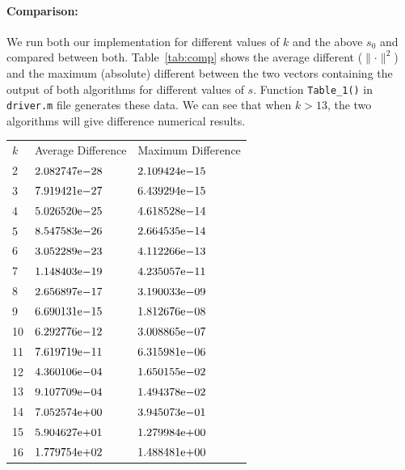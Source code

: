 \paragraph{Comparison:} We run both our implementation for different values of $k$ and the above $s_{0}$ and compared between both. Table~\ref{tab:comp} shows the average different ($\parallel \cdot \parallel^{2}$) and the maximum (absolute) different between the two vectors containing the output of both algorithms for different values of $s$. Function \texttt{Table\_1()} in \texttt{driver.m} file generates these data. We can see that when $k>13$, the two algorithms will give difference numerical results. 

\begin{table}[!tbh]
 \centering    
\begin{tabular}{ |p{1.5cm}| p{4cm}|| p{4cm}|}
\hline
 $k$  & Average Difference & Maximum Difference \\ \hhline{|=|=|=|}   
    2   & ${2.082747}\mathrm{e}{-28}$   & ${2.109424}\mathrm{e}{-15}$   \\
	3   & ${7.919421}\mathrm{e}{-27}$   & ${6.439294}\mathrm{e}{-15}$   \\
	4   & ${5.026520}\mathrm{e}{-25}$   & ${4.618528}\mathrm{e}{-14}$   \\
	5   & ${8.547583}\mathrm{e}{-26}$   & ${2.664535}\mathrm{e}{-14}$   \\
	6   & ${3.052289}\mathrm{e}{-23}$   & ${4.112266}\mathrm{e}{-13}$   \\
	7   & ${1.148403}\mathrm{e}{-19}$   & ${4.235057}\mathrm{e}{-11}$   \\
	8   & ${2.656897}\mathrm{e}{-17}$   & ${3.190033}\mathrm{e}{-09}$   \\
	9   & ${6.690131}\mathrm{e}{-15}$   & ${1.812676}\mathrm{e}{-08}$   \\
	10  & ${6.292776}\mathrm{e}{-12}$   & ${3.008865}\mathrm{e}{-07}$   \\
	11  & ${7.619719}\mathrm{e}{-11}$   & ${6.315981}\mathrm{e}{-06}$   \\
	12  & ${4.360106}\mathrm{e}{-04}$   & ${1.650155}\mathrm{e}{-02}$   \\
	13  & ${9.107709}\mathrm{e}{-04}$   & ${1.494378}\mathrm{e}{-02}$   \\
	14  & ${7.052574}\mathrm{e}{+00}$   & ${3.945073}\mathrm{e}{-01}$   \\
	15  & ${5.904627}\mathrm{e}{+01}$   & ${1.279984}\mathrm{e}{+00}$   \\
	16  & ${1.779754}\mathrm{e}{+02}$   & ${1.488481}\mathrm{e}{+00}$   \\

\end{tabular}
\end{table}
